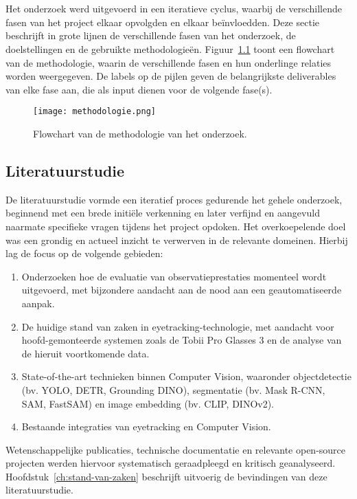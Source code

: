 
\chapter{}%
\label{ch:methodologie}

Het onderzoek werd uitgevoerd in een iteratieve cyclus, waarbij de verschillende fasen van het project elkaar opvolgden en elkaar beïnvloedden.
Deze sectie beschrijft in grote lijnen de verschillende fasen van het onderzoek, de doelstellingen en de gebruikte methodologieën.
Figuur~\ref{fig:methodologie} toont een flowchart van de methodologie, waarin de verschillende fasen en hun onderlinge relaties worden weergegeven.
De labels op de pijlen geven de belangrijkste deliverables van elke fase aan, die als input dienen voor de volgende fase(s).
\begin{figure}[H]
  \centering
  \texttt{[image: methodologie.png]}
  \caption{Flowchart van de methodologie van het onderzoek.}
  \label{fig:methodologie}
\end{figure}

\section{Literatuurstudie}

De literatuurstudie vormde een iteratief proces gedurende het gehele onderzoek, beginnend met een brede initiële verkenning en 
later verfijnd en aangevuld naarmate specifieke vragen tijdens het project opdoken. 
Het overkoepelende doel was een grondig en actueel inzicht te verwerven in de relevante domeinen. 
Hierbij lag de focus op de volgende gebieden: 
\begin{enumerate}
  \item Onderzoeken hoe de evaluatie van observatieprestaties momenteel wordt uitgevoerd, met bijzondere aandacht aan de nood aan een geautomatiseerde aanpak.
  \item De huidige stand van zaken in eyetracking-technologie, met aandacht voor hoofd-gemonteerde systemen zoals de Tobii Pro Glasses 3 en de analyse van de hieruit voortkomende data.
  \item State-of-the-art technieken binnen Computer Vision, waaronder objectdetectie (bv. YOLO, DETR, Grounding DINO), segmentatie (bv. Mask R-CNN, SAM, FastSAM) en image embedding (bv. CLIP, DINOv2).
  \item Bestaande integraties van eyetracking en Computer Vision.
\end{enumerate}
Wetenschappelijke publicaties, technische documentatie en relevante open-sour\-ce projecten werden hiervoor systematisch 
geraadpleegd en kritisch geanalyseerd.
Hoofdstuk~\ref{ch:stand-van-zaken} beschrijft uitvoerig de bevindingen van deze literatuurstudie.

